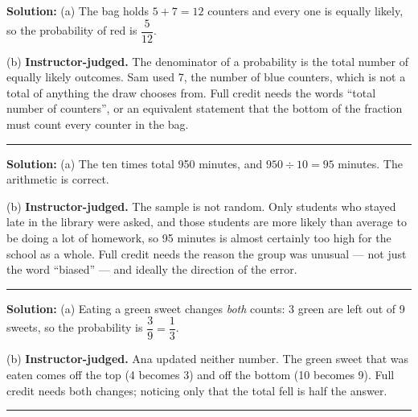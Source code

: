 \documentclass[12pt]{article}
\begin{document}



\textbf{Solution:} (a) The bag holds $5 + 7 = 12$ counters and every one is
equally likely, so the probability of red is
$\dfrac{5}{12}$. 

(b) \textbf{Instructor-judged.} The denominator of a probability is the total
number of equally likely outcomes. Sam used 7, the number of blue counters,
which is not a total of anything the draw chooses from. Full credit needs the
words ``total number of counters'', or an equivalent statement that the bottom
of the fraction must count every counter in the bag.

\vspace{0.25cm}\noindent\rule{\linewidth}{0.2pt}\vspace{0.25cm}


\textbf{Solution:} (a) The ten times total 950 minutes, and
$950 \div 10 = 95$ minutes. The arithmetic is correct. 

(b) \textbf{Instructor-judged.} The sample is not random. Only students who
stayed late in the library were asked, and those students are more likely than
average to be doing a lot of homework, so 95 minutes is almost certainly too
high for the school as a whole. Full credit needs the reason the group was
unusual --- not just the word ``biased'' --- and ideally the direction of the
error.

\vspace{0.25cm}\noindent\rule{\linewidth}{0.2pt}\vspace{0.25cm}


\textbf{Solution:} (a) Eating a green sweet changes \emph{both} counts: 3 green
are left out of 9 sweets, so the probability is
$\dfrac{3}{9} = \dfrac{1}{3}$. 

(b) \textbf{Instructor-judged.} Ana updated neither number. The green sweet that
was eaten comes off the top (4 becomes 3) and off the bottom (10 becomes 9).
Full credit needs both changes; noticing only that the total fell is half the
answer.

\vspace{0.25cm}\noindent\rule{\linewidth}{0.2pt}\vspace{0.25cm}
\end{document}
